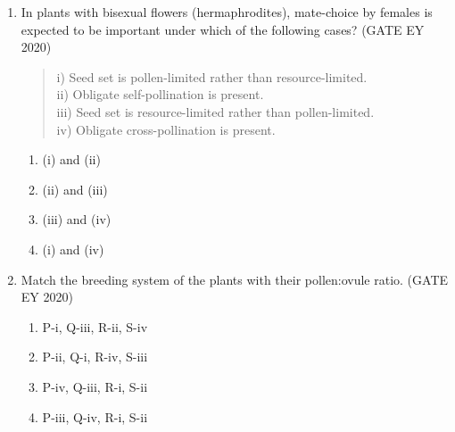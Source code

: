 \begin{enumerate}
\begin{multicols}{2}
\begin{enumerate}
\item The realised niche of P is smaller than its fundamental niche.
\item The realised niche of Q is smaller than its fundamental niche.
\item The realised niche is smaller than the fundamental niche for both species.
\item The realised niches of both species are equal.
\end{enumerate}
\end{multicols}
\item
In plants with bisexual flowers (hermaphrodites), mate-choice by females is expected to be important under which of the following cases? \hfill {(GATE EY 2020)}

\begin{quote}
i) Seed set is pollen-limited rather than resource-limited.\\
ii) Obligate self-pollination is present.\\
iii) Seed set is resource-limited rather than pollen-limited.\\
iv) Obligate cross-pollination is present.
\end{quote}

\begin{multicols}{2}
\begin{enumerate}
\item (i) and (ii)
\item (ii) and (iii)
\item (iii) and (iv)
\item (i) and (iv)
\end{enumerate}
\end{multicols}

\item
Match the breeding system of the plants with their pollen:ovule ratio. \hfill {(GATE EY 2020)}

\begin{multicols}{2}
\begin{enumerate}
\item P-i, Q-iii, R-ii, S-iv
\item P-ii, Q-i, R-iv, S-iii
\item P-iv, Q-iii, R-i, S-ii
\item P-iii, Q-iv, R-i, S-ii
\end{enumerate}
\end{multicols}


\end{enumerate}
